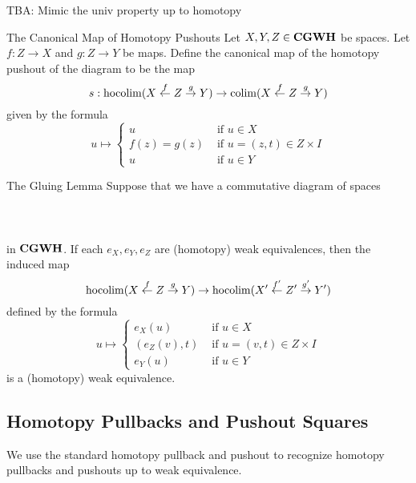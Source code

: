 \documentclass[a4paper]{article}
\begin{document}
TBA: Mimic the univ property up to homotopy

\begin{defn}{The Canonical Map of Homotopy Pushouts}{} Let $X,Y,Z\in\bold{CGWH}$ be spaces. Let $f:Z\to X$ and $g:Z\to Y$ be maps. Define the canonical map of the homotopy pushout of the diagram to be the map $$s:\operatorname*{hocolim}(X\overset{f}{\leftarrow}Z\overset{g}{\rightarrow}Y)\to\operatorname*{colim}(X\overset{f}{\leftarrow}Z\overset{g}{\rightarrow}Y)$$ given by the formula $$u\mapsto\begin{cases}
u & \text{ if }u\in X\\
f(z)=g(z) & \text{ if }u=(z,t)\in Z\times I\\
u & \text{ if }u\in Y
\end{cases}$$
\end{defn}

\begin{thm}{The Gluing Lemma}{} Suppose that we have a commutative diagram of spaces \\~\\
\\~\\
in $\bold{CGWH}$. If each $e_X,e_Y,e_Z$ are (homotopy) weak equivalences, then the induced map $$\operatorname*{hocolim}(X\overset{f}{\leftarrow}Z\overset{g}{\rightarrow}Y)\to\operatorname*{hocolim}(X'\overset{f'}{\leftarrow}Z'\overset{g'}{\rightarrow}Y')$$ defined by the formula $$u\mapsto\begin{cases}
e_X(u) & \text{ if }u\in X\\
(e_Z(v),t) & \text{ if }u=(v,t)\in Z\times I\\
e_Y(u) & \text{ if }u\in Y
\end{cases}$$ is a (homotopy) weak equivalence. 
\end{thm}

\subsection{Homotopy Pullbacks and Pushout Squares}
We use the standard homotopy pullback and pushout to recognize homotopy pullbacks and pushouts up to weak equivalence. 
\end{document}
